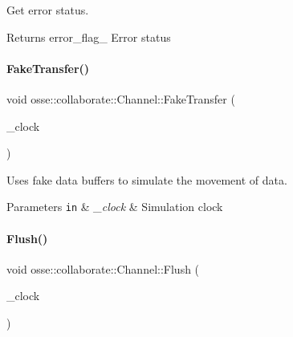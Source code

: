 Get error status. 

\begin{DoxyReturn}{Returns}
error\+\_\+flag\+\_\+ Error status 
\end{DoxyReturn}
\mbox{\label{classosse_1_1collaborate_1_1_channel_afa3d5712ec01f8ebe7c332c6f70b6f34}} 
\paragraph{\texorpdfstring{Fake\+Transfer()}{FakeTransfer()}}
{\footnotesize\ttfamily void osse\+::collaborate\+::\+Channel\+::\+Fake\+Transfer (\begin{DoxyParamCaption}\item[{const \hyperlink{classosse_1_1collaborate_1_1_simulation_clock}{Simulation\+Clock} \&}]{\+\_\+clock }\end{DoxyParamCaption})\hspace{0.3cm}{\ttfamily [private]}}



Uses fake data buffers to simulate the movement of data. 


\begin{DoxyParams}[1]{Parameters}
\mbox{\tt in}  & {\em \+\_\+clock} & Simulation clock \\
\hline
\end{DoxyParams}
\mbox{\label{classosse_1_1collaborate_1_1_channel_a557ea9a5efc851158e8faac44e7727dd}} 
\paragraph{\texorpdfstring{Flush()}{Flush()}}
{\footnotesize\ttfamily void osse\+::collaborate\+::\+Channel\+::\+Flush (\begin{DoxyParamCaption}\item[{const \hyperlink{classosse_1_1collaborate_1_1_simulation_clock}{Simulation\+Clock} \&}]{\+\_\+clock }\end{DoxyParamCaption})\hspace{0.3cm}{\ttfamily [private]}}



